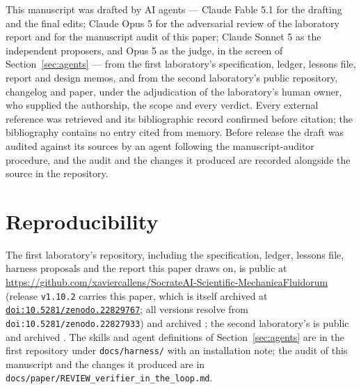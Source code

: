 \documentclass[11pt]{article}
\begin{document}
This manuscript was drafted by AI agents --- Claude Fable 5.1 for the drafting and the final
edits; Claude Opus 5 for the adversarial review of the laboratory report and for the
manuscript audit of this paper; Claude Sonnet 5 as the independent proposers, and Opus 5 as
the judge, in the screen of Section~\ref{sec:agents} --- from the first laboratory's
specification, ledger, lessons file, report and design memos, and from the
second laboratory's public repository, changelog and paper, under the adjudication of the
laboratory's human owner, who supplied the authorship, the scope and every verdict. Every
external reference was retrieved and its bibliographic record confirmed before citation; the
bibliography contains no entry cited from memory. Before release the draft was audited against
its sources by an agent following the manuscript-auditor procedure, and the audit and the
changes it produced are recorded alongside the source in the repository.

\section*{Reproducibility}

The first laboratory's repository, including the specification, ledger, lessons file, harness
proposals and the report this paper draws on, is public at
\url{https://github.com/xaviercallens/SocrateAI-Scientific-MechanicaFluidorum} (release
\texttt{v1.10.2} carries this paper, which is itself archived at
\href{https://doi.org/10.5281/zenodo.22829767}{\texttt{doi:10.5281/zenodo.22829767}}; all
versions resolve from \texttt{doi:10.5281/zenodo.22827933}) and archived
\cite{socrateai2026triad}; the second
laboratory's is public and archived \cite{callens2026reading}. The skills and agent
definitions of Section~\ref{sec:agents} are in the first repository under
\texttt{docs/harness/} with an installation note; the audit of this manuscript and the changes
it produced are in \texttt{docs/paper/REVIEW\_verifier\_in\_the\_loop.md}.
\end{document}
